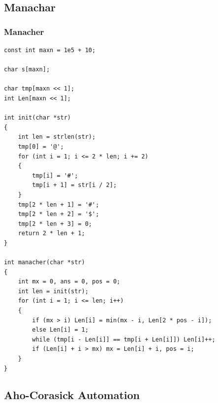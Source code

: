\documentclass[twoside]{article}
\begin{document}
\subsection{Manachar}
\subsubsection{Manacher}
\begin{lstlisting}
const int maxn = 1e5 + 10;

char s[maxn];

char tmp[maxn << 1];
int Len[maxn << 1];

int init(char *str)
{
    int len = strlen(str);
    tmp[0] = '@';
    for (int i = 1; i <= 2 * len; i += 2)
    {
        tmp[i] = '#';
        tmp[i + 1] = str[i / 2];
    }
    tmp[2 * len + 1] = '#';
    tmp[2 * len + 2] = '$';
    tmp[2 * len + 3] = 0;
    return 2 * len + 1;
}

int manacher(char *str)
{
    int mx = 0, ans = 0, pos = 0;
    int len = init(str);
    for (int i = 1; i <= len; i++)
    {
        if (mx > i) Len[i] = min(mx - i, Len[2 * pos - i]);
        else Len[i] = 1;
        while (tmp[i - Len[i]] == tmp[i + Len[i]]) Len[i]++;
        if (Len[i] + i > mx) mx = Len[i] + i, pos = i;
    }
}\end{lstlisting}
\subsection{Aho-Corasick Automation}
\end{document}
